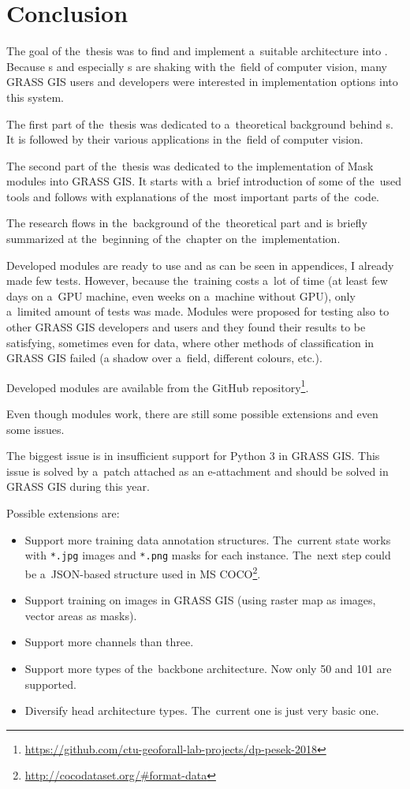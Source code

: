 \chapter{Conclusion}
\label{conclusion}

The goal of the~thesis was to find and implement a~suitable  
architecture into  . Because s and especially 
s are shaking with the~field of computer vision, many GRASS GIS users 
and developers were interested in implementation options into this system.

The first part of the~thesis was dedicated to a~theoretical background behind 
s. It is followed by their various applications in the~field of computer 
vision. 

The second part of the~thesis was dedicated to the implementation of Mask
 modules into GRASS GIS. It starts with a~brief introduction of some
of the~used tools and follows with explanations of the~most important parts of
the~code.

The research flows in the~background of the~theoretical part and is briefly 
summarized at the~beginning of the~chapter on the~implementation.

Developed modules are ready to use and as can be seen in appendices, I already 
made few tests. However, because the~training costs a~lot of time (at least few 
days on a~GPU machine, even weeks on a~machine without GPU), only a~limited 
amount of tests was made. Modules were proposed for testing also to other GRASS 
GIS developers and users and they found their results to be satisfying, 
sometimes even for data, where other methods of classification in GRASS GIS 
failed (a shadow over a~field, different colours, etc.).

Developed modules are available from the GitHub
repository\footnote{\url{https://github.com/ctu-geoforall-lab-projects/dp-pesek-2018}}.

Even though modules work, there are still some possible extensions and even
some issues.

The biggest issue is in insufficient support for Python 3 in GRASS GIS. This 
issue is solved by a~patch attached as an e-attachment and should be solved in 
GRASS GIS during this year.

Possible extensions are:
\begin{itemize}
	\item Support more training data annotation structures. The~current state
	works with \verb|*.jpg| images and \verb|*.png| masks for each instance.
	The~next step could be a~JSON-based structure used in MS
	COCO\footnote{\url{http://cocodataset.org/\#format-data}}.
	\item Support training on images in GRASS GIS (using raster map as images,
	vector areas as masks).
	\item Support more channels than three.
	\item Support more types of the~backbone architecture. Now only  50
	and  101 are supported.
	\item Diversify head architecture types. The~current one is just very basic
	one.
\end{itemize}

